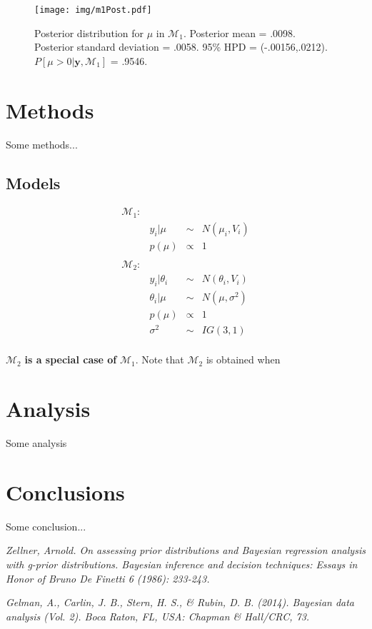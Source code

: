 \documentclass{../../tex_template/asaproc}
\newcommand{\bk}[1]{\left[#1\right]}
\newcommand{\M}{\mathcal{M}}
\begin{document}
\begin{figure}[H]
  \texttt{[image: img/m1Post.pdf]}
  \caption{\small Posterior distribution for $\mu$ in $\M_1$.
  Posterior mean = .0098. Posterior standard deviation = .0058.
  95\% HPD = (-.00156,.0212). $P\bk{\mu>0|\bm{y},\M_1}$ = .9546.}
  \label{fig:m1Post}
\end{figure}



\section{Methods}
Some methods...

\subsection{Models}

$$
\begin{array}{lrcl}
  \M_1: \\
  & y_i | \mu &\sim& N(\mu_i,V_i)\\
  & p(\mu) &\propto& 1\\
  \\
  \M_2: \\
  & y_i | \theta_i &\sim& N(\theta_i,V_i)\\
  & \theta_i | \mu &\sim& N(\mu,\sigma^2)\\
  & p(\mu) &\propto& 1\\
  & \sigma^2 &\sim& IG(3,1)\\
\end{array}
$$

$\M_2$ \textbf{is a special case of} $\M_1$. Note that $\M_2$ is
obtained when 

\section{Analysis}
Some analysis

\section{Conclusions}
Some conclusion...

\begin{references}
{\footnotesize
\itemsep=3pt
\item {\em Zellner, Arnold. On assessing prior distributions and Bayesian regression analysis with g-prior distributions. Bayesian inference and decision techniques: Essays in Honor of Bruno De Finetti 6 (1986): 233-243.}
\item {\em Gelman, A., Carlin, J. B., Stern, H. S., \& Rubin, D. B. (2014). Bayesian data analysis (Vol. 2). Boca Raton, FL, USA: Chapman \& Hall/CRC, 73.}
}
\end{references}
\end{document}
